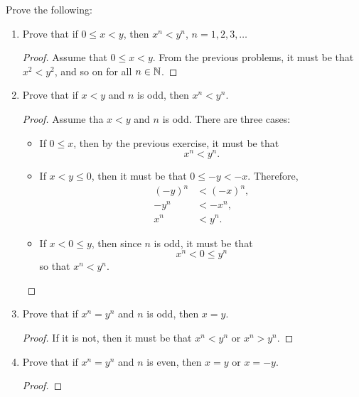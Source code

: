 \begin{exercise}[\textbf{6}] Prove the following:
     \begin{enumerate}
         \item Prove that if $0 \leq x<y$, then $x^n < y^n$, $n=1,2,3,\dotsc$
         \begin{proof} Assume that $0 \leq x < y$. From the previous problems,
         it must be that $x^2<y^2$, and so on for all $n \in \mathbb{N}$.
              
         \end{proof}
         \item Prove that if $x<y$ and $n$ is odd, then $x^n<y^n$.
         \begin{proof}Assume tha $x<y$ and $n$ is odd. There are three cases:
            \begin{itemize}
                \item If $0 \leq x$, then by the previous exercise, it must be that
                \begin{equation*}
                    x^n < y^n.
                \end{equation*} 
                \item If $x<y\leq 0$, then it must be that $0 \leq -y < -x$. Therefore, 
                \begin{align*}
                    (-y)^n &< (-x)^n, \\
                    -y^n &< -x^n, \\
                    x^n &< y^n.
                \end{align*}
                \item If $x<0 \leq y$, then since $n$ is odd, it must be that 
                \begin{equation*}
                    x^n < 0 \leq y^n
                \end{equation*}
                so that $x^n < y^n$.
            \end{itemize}
              
         \end{proof}
         \item Prove that if $x^n = y^n$ and $n$ is odd, then $x=y$.
         \begin{proof} 
            If it is not, then it must be that $x^n < y^n$ or $x^n > y^n$.
              
         \end{proof}
         \item Prove that if $x^n=y^n$ and $n$ is even, then $x=y$ or $x=-y$.
         \begin{proof}
         \end{proof}
\end{enumerate}
\end{exercise}